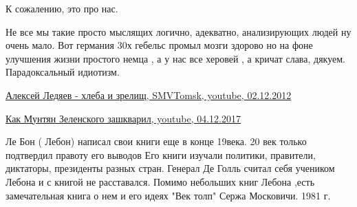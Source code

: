 \begin{itemize}
К сожалению, это про нас.

\begin{itemize}
 

Не все мы такие просто мыслящих логично, адекватно, анализирующих людей ну
очень мало. Вот германия 30х гебельс промыл мозги здорово но на фоне улучшения
жизни простого немца , а у нас все херовей , а кричат слава, дякуем.
Парадоксальный идиотизм.

 
\href{https://www.youtube.com/watch?v=8Msa_vEMiZc}{%
Алексей Ледяев - хлеба и зрелищ, %
SMVTomsk, youtube, 02.12.2012%
}

 
\href{https://www.youtube.com/watch?v=eE-gfuBWs4g}{%
Как Мунтян Зеленского зашкварил, youtube, 04.12.2017%
}

\end{itemize}

 

Ле Бон ( Лебон) написал свои книги еще в конце 19века. 20 век только подтвердил
правоту его выводов Его книги изучали политики, правители, диктаторы, президенты
разных стран. Генерал Де Голль считал себя учеником Лебона и с книгой не
расставался. Помимо небольших книг Лебона ,есть замечательная книга о нем и его
идеях "Век толп" Сержа Московичи. 1981 г.

\begin{itemize}
 

\end{itemize}
\end{itemize}
